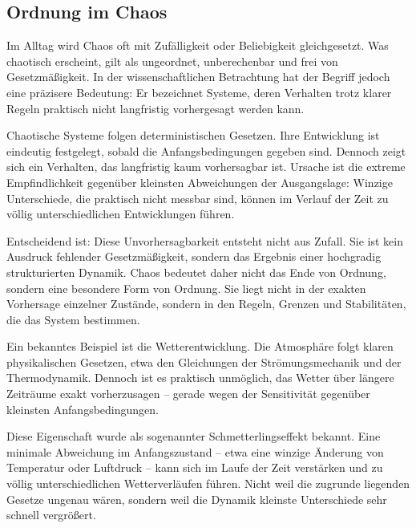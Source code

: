 

\subsection{Ordnung im Chaos}

Im Alltag wird Chaos oft mit Zufälligkeit oder Beliebigkeit gleichgesetzt.
Was chaotisch erscheint,
gilt als ungeordnet,
unberechenbar
und frei von Gesetzmäßigkeit.
In der wissenschaftlichen Betrachtung
hat der Begriff jedoch eine präzisere Bedeutung:
Er bezeichnet Systeme,
deren Verhalten trotz klarer Regeln
praktisch nicht langfristig vorhergesagt werden kann.

Chaotische Systeme folgen deterministischen Gesetzen.
Ihre Entwicklung ist eindeutig festgelegt,
sobald die Anfangsbedingungen gegeben sind.
Dennoch zeigt sich ein Verhalten,
das langfristig kaum vorhersagbar ist.
Ursache ist die extreme Empfindlichkeit
gegenüber kleinsten Abweichungen der Ausgangslage:
Winzige Unterschiede,
die praktisch nicht messbar sind,
können im Verlauf der Zeit
zu völlig unterschiedlichen Entwicklungen führen.

Entscheidend ist:
Diese Unvorhersagbarkeit entsteht nicht aus Zufall.
Sie ist kein Ausdruck fehlender Gesetzmäßigkeit,
sondern das Ergebnis einer hochgradig strukturierten Dynamik.
Chaos bedeutet daher nicht das Ende von Ordnung,
sondern eine besondere Form von Ordnung.
Sie liegt nicht in der exakten Vorhersage einzelner Zustände,
sondern in den Regeln,
Grenzen
und Stabilitäten,
die das System bestimmen.

Ein bekanntes Beispiel ist die Wetterentwicklung.
Die Atmosphäre folgt klaren physikalischen Gesetzen,
etwa den Gleichungen der Strömungsmechanik
und der Thermodynamik.
Dennoch ist es praktisch unmöglich,
das Wetter über längere Zeiträume exakt vorherzusagen --
gerade wegen der Sensitivität gegenüber kleinsten Anfangsbedingungen.

Diese Eigenschaft wurde
als sogenannter Schmetterlingseffekt bekannt.
Eine minimale Abweichung im Anfangszustand --
etwa eine winzige Änderung von Temperatur oder Luftdruck --
kann sich im Laufe der Zeit verstärken
und zu völlig unterschiedlichen Wetterverläufen führen.
Nicht weil die zugrunde liegenden Gesetze ungenau wären,
sondern weil die Dynamik
kleinste Unterschiede sehr schnell vergrößert.

